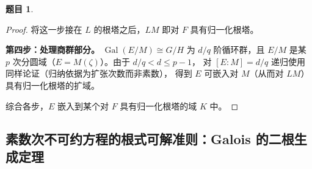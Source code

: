 \documentclass[a4paper]{ctexart}
\theoremstyle{definition}
\newtheorem{example}{题目}[section]
\theoremstyle{analysis}
\theoremstyle{plain}
\begin{document}
\begin{example}
\begin{proof}
将这一步接在 \(L\) 的根塔之后，\(LM\) 即对 \(F\) 具有归一化根塔。

\textbf{第四步：处理商群部分。}
\(\operatorname{Gal}(E/M)\cong G/H\) 为 \(d/q\) 阶循环群，且
\(E/M\) 是某 \(p\) 次分圆域（\(E=M(\zeta)\)）。由于 \(d/q<d\le p-1\)，
对 \([E:M]=d/q\) 递归使用同样论证（归纳依据为扩张次数而非素数），
得到 \(E\) 可嵌入对 \(M\)（从而对 \(LM\)）具有归一化根塔的扩域。

综合各步，\(E\) 嵌入到某个对 \(F\) 具有归一化根塔的域 \(K\) 中。
\end{proof}
\end{example}

\subsection{\texorpdfstring{素数次不可约方程的根式可解准则：Galois 的二根生成定理}{素数次不可约方程的根式可解准则}}\label{subsec:problem-galois-two-root}
\end{document}
